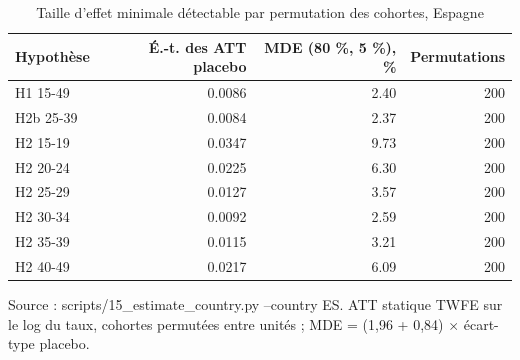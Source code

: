 \begin{table}[htbp]\centering
\begin{threeparttable}
\caption{Taille d'effet minimale détectable par permutation des cohortes, Espagne}\label{tab:es_mde}
\small
\begin{tabular}{lrrr}
\toprule
Hypothèse & É.-t. des ATT placebo & MDE (80 \%, 5 \%), \% & Permutations \\
\midrule
H1 15-49 & 0.0086 & 2.40 & 200 \\
H2b 25-39 & 0.0084 & 2.37 & 200 \\
H2 15-19 & 0.0347 & 9.73 & 200 \\
H2 20-24 & 0.0225 & 6.30 & 200 \\
H2 25-29 & 0.0127 & 3.57 & 200 \\
H2 30-34 & 0.0092 & 2.59 & 200 \\
H2 35-39 & 0.0115 & 3.21 & 200 \\
H2 40-49 & 0.0217 & 6.09 & 200 \\
\bottomrule
\end{tabular}
\begin{tablenotes}\footnotesize
\item Source : scripts/15\_estimate\_country.py --country ES. ATT statique TWFE sur le log du taux, cohortes permutées entre unités ; MDE = (1,96 + 0,84) $\times$ écart-type placebo.
\end{tablenotes}
\end{threeparttable}
\end{table}
